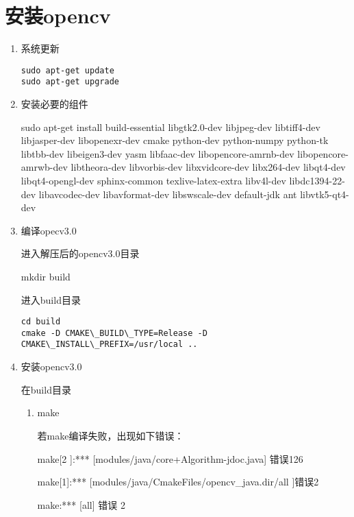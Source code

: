 \documentclass[12pt]{article}
\begin{document}
\section{安装opencv}

\begin{enumerate}

\item 系统更新

\begin{lstlisting}
sudo apt-get update
sudo apt-get upgrade
\end{lstlisting}

\item 安装必要的组件

sudo apt-get install build-essential libgtk2.0-dev libjpeg-dev libtiff4-dev libjasper-dev libopenexr-dev cmake python-dev python-numpy python-tk libtbb-dev libeigen3-dev yasm libfaac-dev libopencore-amrnb-dev libopencore-amrwb-dev libtheora-dev libvorbis-dev libxvidcore-dev libx264-dev libqt4-dev libqt4-opengl-dev sphinx-common texlive-latex-extra libv4l-dev libdc1394-22-dev libavcodec-dev libavformat-dev libswscale-dev default-jdk ant libvtk5-qt4-dev


\item 编译opecv3.0

进入解压后的opencv3.0目录

mkdir build

进入build目录
\begin{lstlisting}
cd build
cmake -D CMAKE\_BUILD\_TYPE=Release -D CMAKE\_INSTALL\_PREFIX=/usr/local ..
\end{lstlisting}


\item 安装opencv3.0

在build目录

\begin{enumerate}

\item make  

若make编译失败，出现如下错误：

make[2 ]:*** [modules/java/core+Algorithm-jdoc.java] 错误126

make[1]:*** [modules/java/CmakeFiles/opencv\_java.dir/all ]错误2

make:*** [all] 错误 2


\end{enumerate}
\end{enumerate}
\end{document}
